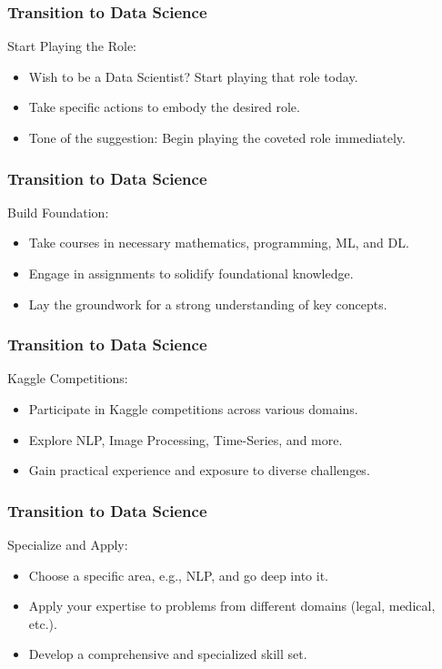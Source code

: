 \begin{frame}[fragile]\frametitle{Transition to Data Science}

Start Playing the Role:
        \begin{itemize}
            \item Wish to be a Data Scientist? Start playing that role today.
            \item Take specific actions to embody the desired role.
            \item Tone of the suggestion: Begin playing the coveted role immediately.
        \end{itemize}
			
\end{frame}

\begin{frame}[fragile]\frametitle{Transition to Data Science}

Build Foundation:
        \begin{itemize}
            \item Take courses in necessary mathematics, programming, ML, and DL.
            \item Engage in assignments to solidify foundational knowledge.
            \item Lay the groundwork for a strong understanding of key concepts.
        \end{itemize}
			
\end{frame}

\begin{frame}[fragile]\frametitle{Transition to Data Science}

Kaggle Competitions:
        \begin{itemize}
            \item Participate in Kaggle competitions across various domains.
            \item Explore NLP, Image Processing, Time-Series, and more.
            \item Gain practical experience and exposure to diverse challenges.
        \end{itemize}
			
\end{frame}

\begin{frame}[fragile]\frametitle{Transition to Data Science}

Specialize and Apply:
        \begin{itemize}
            \item Choose a specific area, e.g., NLP, and go deep into it.
            \item Apply your expertise to problems from different domains (legal, medical, etc.).
            \item Develop a comprehensive and specialized skill set.
        \end{itemize}
			
\end{frame}

